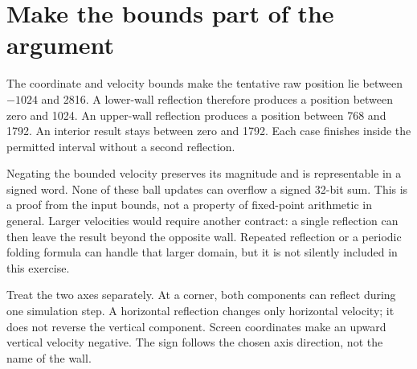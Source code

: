 \section{Make the bounds part of the argument}
The coordinate and velocity bounds make the tentative raw position lie between
\(-1024\) and 2816. A lower-wall reflection therefore produces a position between
zero and 1024. An upper-wall reflection produces a position between 768 and 1792.
An interior result stays between zero and 1792. Each case finishes inside the
permitted interval without a second reflection.

Negating the bounded velocity preserves its magnitude and is representable in a
signed word. None of these ball updates can overflow a signed 32-bit sum. This
is a proof from the input bounds, not a property of fixed-point arithmetic in
general. Larger velocities would require another contract: a single reflection
can then leave the result beyond the opposite wall. Repeated reflection or a
periodic folding formula can handle that larger domain, but it is not silently
included in this exercise.

Treat the two axes separately. At a corner, both components can reflect during
one simulation step. A horizontal reflection changes only horizontal velocity;
it does not reverse the vertical component. Screen coordinates make an upward
vertical velocity negative. The sign follows the chosen axis direction, not
the name of the wall.
